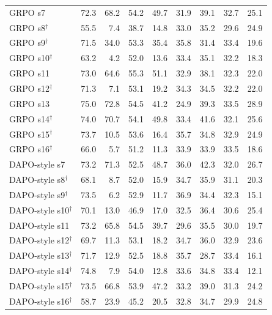 \documentclass[11pt]{article}
\begin{document}
\begin{table}[p]
{\begin{tabular}{lrrrrrrrr}
\midrule
GRPO s7 & 72.3 & 68.2 & 54.2 & 49.7 & 31.9 & 39.1 & 32.7 & 25.1 \\
GRPO s8$^\dagger$ & 55.5 & 7.4 & 38.7 & 14.8 & 33.0 & 35.2 & 29.6 & 24.9 \\
GRPO s9$^\dagger$ & 71.5 & 34.0 & 53.3 & 35.4 & 35.8 & 31.4 & 33.4 & 19.6 \\
GRPO s10$^\dagger$ & 63.2 & 4.2 & 52.0 & 13.6 & 33.4 & 35.1 & 32.2 & 18.3 \\
GRPO s11 & 73.0 & 64.6 & 55.3 & 51.1 & 32.9 & 38.1 & 32.3 & 22.0 \\
GRPO s12$^\dagger$ & 71.3 & 7.1 & 53.1 & 19.2 & 34.3 & 34.5 & 32.2 & 22.0 \\
GRPO s13 & 75.0 & 72.8 & 54.5 & 41.2 & 24.9 & 39.3 & 33.5 & 28.9 \\
GRPO s14$^\dagger$ & 74.0 & 70.7 & 54.1 & 49.8 & 33.4 & 41.6 & 32.1 & 25.6 \\
GRPO s15$^\dagger$ & 73.7 & 10.5 & 53.6 & 16.4 & 35.7 & 34.8 & 32.9 & 24.9 \\
GRPO s16$^\dagger$ & 66.0 & 5.7 & 51.2 & 11.3 & 33.9 & 33.9 & 33.5 & 18.6 \\
\midrule
DAPO-style s7 & 73.2 & 71.3 & 52.5 & 48.7 & 36.0 & 42.3 & 32.0 & 26.7 \\
DAPO-style s8$^\dagger$ & 68.1 & 8.7 & 52.0 & 15.9 & 34.7 & 35.9 & 31.1 & 20.3 \\
DAPO-style s9$^\dagger$ & 73.5 & 6.2 & 52.9 & 11.7 & 36.9 & 34.4 & 32.3 & 15.1 \\
DAPO-style s10$^\dagger$ & 70.1 & 13.0 & 46.9 & 17.0 & 32.5 & 36.4 & 30.6 & 25.4 \\
DAPO-style s11 & 73.2 & 65.8 & 54.5 & 39.7 & 29.6 & 35.5 & 30.0 & 19.7 \\
DAPO-style s12$^\dagger$ & 69.7 & 11.3 & 53.1 & 18.2 & 34.7 & 36.0 & 32.9 & 23.6 \\
DAPO-style s13$^\dagger$ & 71.7 & 12.9 & 52.5 & 18.8 & 35.7 & 28.7 & 33.4 & 16.1 \\
DAPO-style s14$^\dagger$ & 74.8 & 7.9 & 54.0 & 12.8 & 33.6 & 34.8 & 33.4 & 12.1 \\
DAPO-style s15$^\dagger$ & 73.5 & 66.8 & 53.9 & 47.2 & 33.2 & 39.0 & 31.3 & 24.2 \\
DAPO-style s16$^\dagger$ & 58.7 & 23.9 & 45.2 & 20.5 & 32.8 & 34.7 & 29.9 & 24.8 \\
\bottomrule
\end{tabular}}
\end{table}
\end{document}
